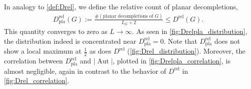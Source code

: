 \documentclass[11pt,a4paper]{article}
\newcommand{\abs}[1]{\lvert #1 \rvert}
\newcommand{\Aut}{\operatorname{Aut}}
\renewcommand{\|}{\rule[-0.4ex]{0.2ex}{1.2em}}
\begin{document}
In analogy to \cref{def:Drel}, we define the relative count of planar decompletions,
\begin{align}\label{def:Drel_planar}
	 D^\text{rel}_\text{pla} (G)   := \frac{\#( \text{planar decompletions of }G)}{L_G + 2}   \leq D^\text{rel}(G).
\end{align}
This quantity converges to zero as $L\rightarrow \infty$. As seen in \cref{fig:Drelpla_distribution}, the distribution indeed is concentrated near $ D^\text{rel}_\text{pla}=0$.  Note that $ D^\text{rel}_\text{pla}$ does not show a local maximum at $\frac 12$ as does $D^\text{rel}$ (\cref{fig:Drel_distribution}). Moreover, the correlation between $D^\text{rel}_\text{pla}$ and $\abs{\Aut}$, plotted in \cref{fig:Drelpla_correlation}, is almost negligible, again in contrast to the behavior of $D^\text{rel}$ in \cref{fig:Drel_correlation}.
\end{document}
